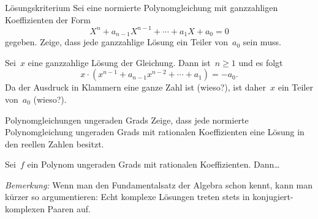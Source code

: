 \documentclass{algblatt}
\begin{document}

\begin{aufgabe}{Lösungskriterium}
Sei eine normierte Polynomgleichung mit ganzzahligen Koeffizienten
der Form
\[ X^n + a_{n-1} X^{n-1} + \cdots + a_1 X + a_0 = 0 \]
gegeben. Zeige, dass
jede ganzzahlige Lösung ein Teiler von~$a_0$ sein muss.
\begin{loesung}Sei~$x$ eine ganzzahlige Lösung der Gleichung. Dann ist~$n \geq
1$ und es folgt
\[ x \cdot (x^{n-1} + a_{n-1} x^{n-2} + \cdots + a_1) = -a_0. \]
Da der Ausdruck in Klammern eine ganze Zahl ist (wieso?), ist daher~$x$ ein
Teiler von~$a_0$ (wieso?).
\end{loesung}
\end{aufgabe}

\begin{aufgabe}{Polynomgleichungen ungeraden Grads}
Zeige, dass jede normierte Polynomgleichung ungeraden Grads mit rationalen
Koeffizienten eine Lösung in den reellen Zahlen besitzt.
\begin{loesung}Sei~$f$ ein Polynom ungeraden Grads mit rationalen
Koeffizienten. Dann\ldots

\emph{Bemerkung:} Wenn man den Fundamentalsatz der Algebra schon kennt, kann
man kürzer so argumentieren: Echt komplexe Lösungen treten stets in
konjugiert-komplexen Paaren auf.
\end{loesung}
\end{aufgabe}
\end{document}
